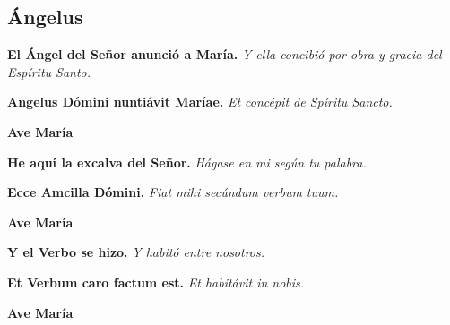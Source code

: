 \documentclass[./devocionario.tex]{subfiles}
\begin{document}
\subsection*{Ángelus}
\begin{multicols}{2}
    \textbf{El Ángel del Señor anunció a María.}\newline
    \textit{Y ella concibió por obra y gracia del Espíritu Santo.}

    \columnbreak

    \textbf{Angelus Dómini nuntiávit Maríae.}\newline
    \textit{Et concépit de Spíritu Sancto.}
\end{multicols}

\begin{center}
    \textbf{Ave María}
\end{center}

\begin{multicols}{2}
    \textbf{He aquí la excalva del Señor.}\newline
    \textit{Hágase en mi según tu palabra.}

    \columnbreak

    \textbf{Ecce Amcilla Dómini.}\newline
    \textit{Fiat mihi secúndum verbum tuum.}
\end{multicols}

\begin{center}
    \textbf{Ave María}
\end{center}

\begin{multicols}{2}
    \textbf{Y el Verbo se hizo.}\newline
    \textit{Y habitó entre nosotros.}

    \columnbreak

    \textbf{Et Verbum caro factum est.}\newline
    \textit{Et habitávit in nobis.}
\end{multicols}

\begin{center}
    \textbf{Ave María}
\end{center}
\end{document}
